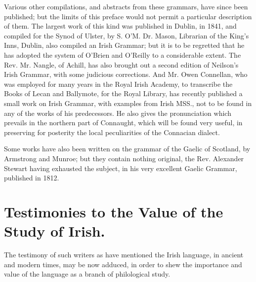 \documentclass[11pt,oneside]{memoir}
\begin{document}
Various other compilations, and abstracts from these grammars, have since been published; but the limits of this preface would not permit a particular description of them.
The largest work of this kind was published in Dublin, in 1841, and compiled for the Synod of Ulster, by S. O'M.
Dr. Mason, Librarian of the King's Inns, Dublin, also compiled an Irish Grammar; but it is to be regretted that he has adopted the system of O'Brien and O'Reilly to a considerable extent.
The Rev. Mr. Nangle, of Achill, has also brought out a second edition of Neilson's Irish Grammar, with some judicious corrections.
And Mr. Owen Connellan, who was employed for many years in the Royal Irish Academy, to transcribe the Books of Lecan and Ballymote, for the Royal Library, has recently published a small work on Irish Grammar, with examples from Irish MSS., not to be found in any of the works of his predecessors.
He also gives the pronunciation which prevails in the northern part of Connaught, which will be found very useful, in preserving for posterity the local peculiarities of the Connacian dialect. 

Some works have also been written on the grammar of the Gaelic of Scotland, by Armstrong and Munroe; but they contain nothing original, the Rev. Alexander Stewart having exhausted the subject, in his very excellent Gaelic Grammar, published in 1812.

\section{Testimonies to the Value of the Study of Irish.}
The testimony of such writers as have mentioned the Irish language, in ancient and modern times, may be now adduced, in order to shew the importance and value of the language as a branch of philological study.
\end{document}

